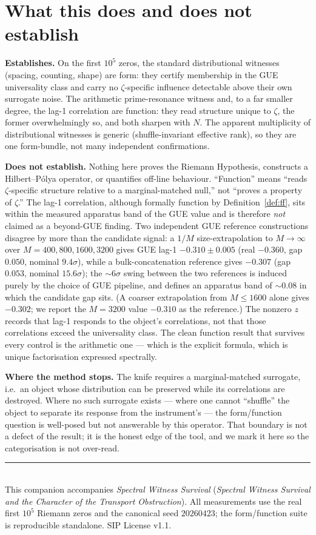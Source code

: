 \documentclass[11pt]{article}
\begin{document}
\section{What this does and does not establish}

\textbf{Establishes.} On the first $10^5$ zeros, the standard distributional witnesses (spacing, counting, shape) are form: they certify membership in the GUE universality class and carry no $\zeta$-specific influence detectable above their own surrogate noise. The arithmetic prime-resonance witness and, to a far smaller degree, the lag-1 correlation are function: they read structure unique to $\zeta$, the former overwhelmingly so, and both sharpen with $N$. The apparent multiplicity of distributional witnesses is generic (shuffle-invariant effective rank), so they are one form-bundle, not many independent confirmations.

\textbf{Does not establish.} Nothing here proves the Riemann Hypothesis, constructs a Hilbert--P\'olya operator, or quantifies off-line behaviour. ``Function'' means ``reads $\zeta$-specific structure relative to a marginal-matched null,'' not ``proves a property of $\zeta$.'' The lag-1 correlation, although formally function by Definition~\ref{def:ff}, sits within the measured apparatus band of the GUE value and is therefore \emph{not} claimed as a beyond-GUE finding. Two independent GUE reference constructions disagree by more than the candidate signal: a $1/M$ size-extrapolation to $M\to\infty$ over $M=400,800,1600,3200$ gives GUE lag-1 $-0.310\pm0.005$ (real $-0.360$, gap $0.050$, nominal $9.4\sigma$), while a bulk-concatenation reference gives $-0.307$ (gap $0.053$, nominal $15.6\sigma$); the $\sim\!6\sigma$ swing between the two references is induced purely by the choice of GUE pipeline, and defines an apparatus band of $\sim\!0.08$ in which the candidate gap sits. (A coarser extrapolation from $M\le1600$ alone gives $-0.302$; we report the $M=3200$ value $-0.310$ as the reference.) The nonzero $z$ records that lag-1 responds to the object's correlations, not that those correlations exceed the universality class. The clean function result that survives every control is the arithmetic one --- which is the explicit formula, which is unique factorisation expressed spectrally.

\textbf{Where the method stops.} The knife requires a marginal-matched surrogate, i.e.\ an object whose distribution can be preserved while its correlations are destroyed. Where no such surrogate exists --- where one cannot ``shuffle'' the object to separate its response from the instrument's --- the form/function question is well-posed but not answerable by this operator. That boundary is not a defect of the result; it is the honest edge of the tool, and we mark it here so the categorisation is not over-read.

\vspace{1em}
\noindent\rule{\linewidth}{0.4pt}\\
\small This companion accompanies \textit{Spectral Witness Survival} (\emph{Spectral Witness Survival and the Character of the Transport Obstruction}). All measurements use the real first $10^5$ Riemann zeros and the canonical seed $20260423$; the form/function suite is reproducible standalone. SIP License v1.1.
\end{document}
